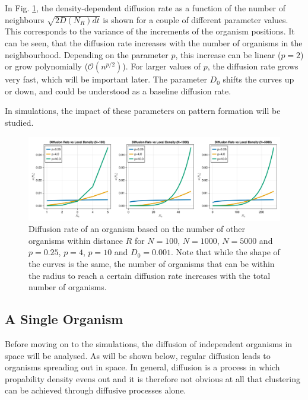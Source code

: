\documentclass{article}
\begin{document}
In Fig. \ref{diffusion_rates}, the density-dependent diffusion rate as a function of the number of neighbours $\sqrt{2D(N_R) dt}$ is shown for a couple of different parameter values. 
This corresponds to the variance of the increments of the organism positions.
It can be seen, that the diffusion rate increases with the number of organisms in the neighbourhood.
Depending on the parameter $p$, this increase can be linear ($p=2$) or grow polynomially ($\mathcal{O}(n^{p/2})$). 
For larger values of $p$, the diffusion rate grows very fast, which will be important later.
The parameter $D_0$ shifts the curves up or down, and could be understood as a baseline diffusion rate.

In simulations, the impact of these parameters on pattern formation will be studied.

\begin{figure}[h]
    \centering
    \includegraphics[width=1.0\linewidth]{img/diffusion_rates.png}
    \caption{Diffusion rate of an organism based on the number of other organisms within distance $R$ for $N=100$, $N=1000$, $N=5000$ and $p=0.25$, $p=4$, $p=10$ and $D_0 = 0.001$. Note that while the shape of the curves is the same, the number of organisms that can be within the radius to reach a certain diffusion rate increases with the total number of organisms.}
    \label{diffusion_rates} 
\end{figure}

\subsection{A Single Organism}
Before moving on to the simulations, the diffusion of independent organisms in space will be analysed.
As will be shown below, regular diffusion leads to organisms spreading out in space.
In general, diffusion is a process in which propability density evens out and it is therefore not obvious at all that clustering can be achieved through diffusive processes alone.
\end{document}

